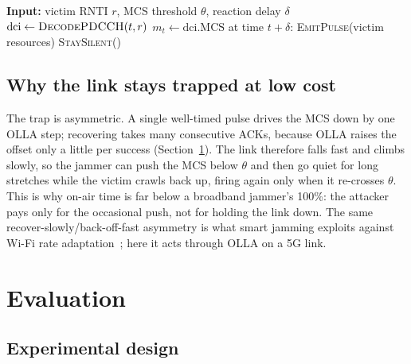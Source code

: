 \documentclass[conference]{IEEEtran}
\begin{document}
\begin{algorithm}[t]
\caption{Reactive MCS-downgrade jammer}
\label{alg:attack}
\begin{algorithmic}[1]
\State \textbf{Input:} victim RNTI $r$, MCS threshold $\theta$, reaction delay $\delta$
  \State $\mathrm{dci} \gets \textsc{DecodePDCCH}(t, r)$ 
  \State $m_t \gets \mathrm{dci}.\mathrm{MCS}$ 
   
    \State at time $t+\delta$: \textsc{EmitPulse}(victim resources)
    \State {}
  \Else {}
    \State \textsc{StaySilent}() 
  \EndIf
\EndFor
\end{algorithmic}
\end{algorithm}

\subsection{Why the link stays trapped at low cost}
The trap is asymmetric. A single well-timed pulse drives the MCS down by one OLLA step;
recovering takes many consecutive ACKs, because OLLA raises the offset only a little per
success (Section~\ref{sec:eval}). The link therefore falls fast and climbs slowly, so the
jammer can push the MCS below $\theta$ and then go quiet for long stretches while the
victim crawls back up, firing again only when it re-crosses $\theta$. This is why on-air
time is far below a broadband jammer's 100\%: the attacker pays only for the occasional
push, not for holding the link down. The same recover-slowly/back-off-fast asymmetry is
what smart jamming exploits against Wi-Fi rate adaptation~\cite{thapa2011rate}; here it
acts through OLLA on a 5G link.

\section{Evaluation}
\label{sec:eval}

\subsection{Experimental design}
\end{document}
